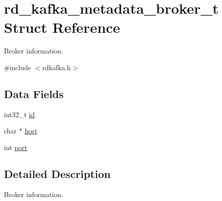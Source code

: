 \hypertarget{structrd__kafka__metadata__broker__t}{
\section{rd\_\-kafka\_\-metadata\_\-broker\_\-t Struct Reference}
\label{structrd__kafka__metadata__broker__t}
}


Broker information.  


{\ttfamily \#include $<$rdkafka.h$>$}\subsection*{Data Fields}
\begin{DoxyCompactItemize}
\item 
int32\_\-t \hyperlink{structrd__kafka__metadata__broker__t_a4429aaa53ac19ed33856323242899f9c}{id}
\item 
char $\ast$ \hyperlink{structrd__kafka__metadata__broker__t_a793daa60734030950ef9abdc97220284}{host}
\item 
int \hyperlink{structrd__kafka__metadata__broker__t_a669f85d48fd084f36a47f2654115b165}{port}
\end{DoxyCompactItemize}


\subsection{Detailed Description}
Broker information. 

